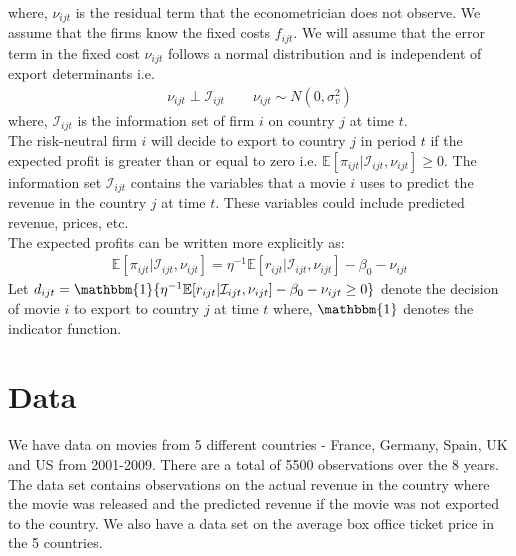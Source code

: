 \documentclass[11pt, letterpaper]{article} \usepackage{amsmath}
\begin{document}
where, $\nu_{ijt}$ is the residual term that the econometrician does
not observe. We assume that the firms know the fixed costs $f_{ijt}$.
We will assume that the error term in the fixed cost $\nu_{ijt}$
follows a normal distribution and is independent of export
determinants i.e.
\begin{align*}
  \nu_{ijt} \perp \mathcal{I}_{ijt} \qquad \nu_{ijt} \sim N(0, \sigma_v^2)
\end{align*}
where, $\mathcal{I}_{ijt}$ is the information set of firm $i$ on
country $j$ at time $t$.\\
The risk-neutral firm $i$ will decide to export to country $j$ in
period $t$ if the expected profit is greater than or equal to zero
i.e. $\mathbb{E}[\pi_{ijt} | \mathcal{I}_{ijt}, \nu_{ijt}] \geq 0$.
The information set $\mathcal{I}_{ijt}$ contains the variables that a
movie $i$ uses to predict the revenue in the country $j$ at time
$t$. These variables could include predicted revenue, prices, etc.\\
The expected profits can be written more explicitly as:
\begin{align*}
  \mathbb{E}[\pi_{ijt}|\mathcal{I}_{ijt}, \nu_{ijt}] = \eta^{-1}
  \mathbb{E}[r_{ijt} | \mathcal{I}_{ijt}, \nu_{ijt}] - \beta_0 - \nu_{ijt}
\end{align*}
Let
$d_{ijt} = \mathbbm{1}\{\eta^{-1}\mathbb{E}[r_{ijt} |
\mathcal{I}_{ijt}, \nu_{ijt}] - \beta_0 - \nu_{ijt} \geq 0\}$
denote the decision of movie $i$ to export to country $j$ at time $t$
where, $\mathbbm{1}$ denotes the indicator function.
\section{Data}
We have data on movies from 5 different countries - France, Germany,
Spain, UK and US from 2001-2009. There are a total of 5500
observations over the 8 years. The data set contains observations on
the actual revenue in the country where the movie was released and the
predicted revenue if the movie was not exported to the country. We
also have a data set on the average box office ticket price in the 5
countries.
\end{document}
